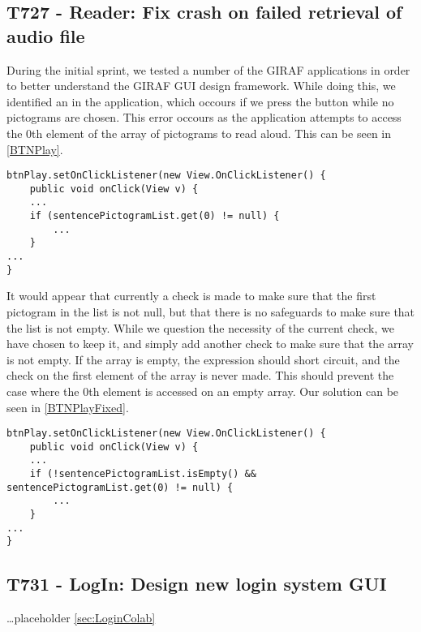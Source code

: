 \subsection{T727 - Reader: Fix crash on failed retrieval of audio file}
During the initial sprint, we tested a number of the GIRAF applications in order
to better understand the GIRAF GUI design framework. While doing this, we
identified an  in the 
application, which occours if we press the  button while no
pictograms are chosen. This error occours as the application attempts to access
the 0th element of the array of pictograms to read aloud. This can be seen in
\autoref{BTNPlay}.\nl

\begin{minipage}[H]{\linewidth}
\begin{lstlisting}[caption = Accessing the 0th element of a null array., label = BTNPlay] 
btnPlay.setOnClickListener(new View.OnClickListener() {
	public void onClick(View v) {
	...
	if (sentencePictogramList.get(0) != null) {
		...
	}
...
}
\end{lstlisting}
\end{minipage}

It would appear that currently a check is made to make sure that the first
pictogram in the list is not null, but that there is no safeguards to make sure
that the list is not empty. While we question the necessity of the current
check, we have chosen to keep it, and simply add another check to make sure that
the array is not empty. If the array is empty, the expression should short
circuit, and the check on the first element of the array is never made. This
should prevent the case where the 0th element is accessed on an empty array. Our
solution can be seen in \autoref{BTNPlayFixed}.\nl

\begin{minipage}[H]{\linewidth}
\begin{lstlisting}[caption = Our solution to the presented problem., label = BTNPlayFixed] 
btnPlay.setOnClickListener(new View.OnClickListener() {
	public void onClick(View v) {
	...
	if (!sentencePictogramList.isEmpty() && sentencePictogramList.get(0) != null) {
		...
	}
...
}
\end{lstlisting}
\end{minipage}

\subsection{T731 - LogIn: Design new login system GUI}
\ldots placeholder \autoref{sec:LoginColab}

